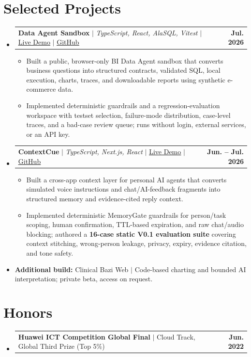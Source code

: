 \documentclass[letterpaper,10pt]{article}
\makeatletter
\newcommand{\resumeItem}[1]{
  \item\small{{#1 \vspace{-3pt}}}
}
\newcommand{\resumeProjectHeading}[2]{
  \item
  \begin{tabular*}{1.0\textwidth}{l@{\extracolsep{\fill}}r}
    \small #1 & \textbf{\small #2} \\
  \end{tabular*}\vspace{-7pt}
}
\newcommand{\resumeSubHeadingListStart}{\begin{itemize}[leftmargin=0.0in,label={}]}
\newcommand{\resumeSubHeadingListEnd}{\end{itemize}}
\newcommand{\resumeItemListStart}{\begin{itemize}[leftmargin=0.16in]}
\newcommand{\resumeItemListEnd}{\end{itemize}\vspace{-7pt}}
\makeatother
\begin{document}
\section{Selected Projects}
\vspace{-5pt}
\resumeSubHeadingListStart
  \resumeProjectHeading
    {\textbf{Data Agent Sandbox} $|$ \emph{TypeScript, React, AlaSQL, Vitest} $|$ \href{https://data-agent-sandbox.vercel.app/}{\underline{Live Demo}} $|$ \href{https://github.com/HaoPan036/Data-Agent-Sandbox}{\underline{GitHub}}}{Jul. 2026}
    \resumeItemListStart
      \resumeItem{Built a public, browser-only BI Data Agent sandbox that converts business questions into structured contracts, validated SQL, local execution, charts, traces, and downloadable reports using synthetic e-commerce data.}
      \resumeItem{Implemented deterministic guardrails and a regression-evaluation workspace with testset selection, failure-mode distribution, case-level traces, and a bad-case review queue; runs without login, external services, or an API key.}
    \resumeItemListEnd
  \resumeProjectHeading
    {\textbf{ContextCue} $|$ \emph{TypeScript, Next.js, React} $|$ \href{https://contex-cue.vercel.app/}{\underline{Live Demo}} $|$ \href{https://github.com/HaoPan036/ContexCue}{\underline{GitHub}}}{Jun. -- Jul. 2026}
    \resumeItemListStart
      \resumeItem{Built a cross-app context layer for personal AI agents that converts simulated voice instructions and chat/AI-feedback fragments into structured memory and evidence-cited reply context.}
      \resumeItem{Implemented deterministic MemoryGate guardrails for person/task scoping, human confirmation, TTL-based expiration, and raw chat/audio blocking; authored a \textbf{16-case static V0.1 evaluation suite} covering context stitching, wrong-person leakage, privacy, expiry, evidence citation, and tone safety.}
    \resumeItemListEnd
  \resumeItem{\textbf{Additional build:} Clinical Bazi Web $|$ Code-based charting and bounded AI interpretation; private beta, access on request.}
\resumeSubHeadingListEnd
\vspace{-11pt}

\section{Honors}
\resumeSubHeadingListStart
  \resumeProjectHeading
    {\textbf{Huawei ICT Competition Global Final} $|$ Cloud Track, Global Third Prize (Top 5\%)}{Jun. 2022}
\resumeSubHeadingListEnd
\vspace{-12pt}
\end{document}
